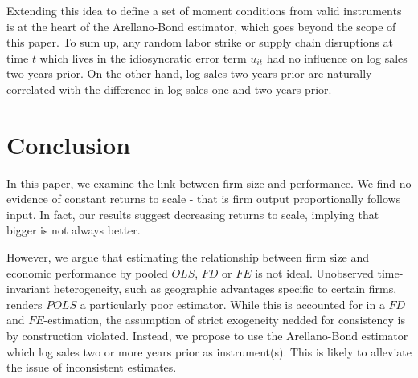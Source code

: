 \documentclass[11pt]{article}
\begin{document}
Extending this idea to define a set of moment conditions from valid instruments is at the heart of the Arellano-Bond estimator, which goes beyond the scope of this paper. To sum up, any random labor strike or supply chain disruptions at time $t$ which lives in the idiosyncratic error term $u_{it}$ had no influence on log sales two years prior. On the other hand, log sales two years prior are naturally correlated with the difference in log sales one and two years prior.

\section{Conclusion}
In this paper, we examine the link between firm size and performance. We find no evidence of constant returns to scale - that is firm output proportionally follows input. In fact, our results suggest decreasing returns to scale, implying that bigger is not always better. 

However, we argue that estimating the relationship between firm size and economic performance by pooled $OLS$, $FD$ or $FE$ is not ideal. Unobserved time-invariant heterogeneity, such as geographic advantages specific to certain firms, renders $POLS$ a particularly poor estimator. While this is accounted for in a $FD$ and $FE$-estimation, the assumption of strict exogeneity nedded for consistency is by construction violated. Instead, we propose to use the Arellano-Bond estimator which log sales two or more years prior as instrument(s). This is likely to alleviate the issue of inconsistent estimates. 



\newpage
\begin{small}

\end{small}

\end{document}
